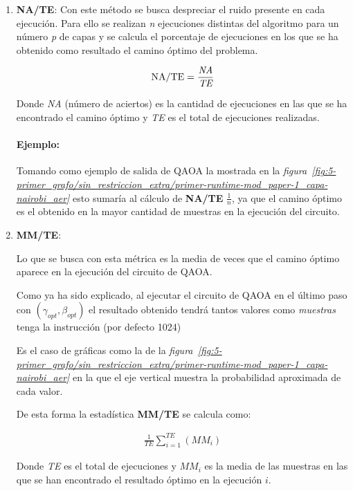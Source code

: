 \begin{enumerate}
\item\label{it:5-na} \textbf{NA/TE}:
  Con este método se busca despreciar el ruido presente en cada ejecución.
  Para ello se realizan \textit{n} ejecuciones distintas del algoritmo para un número \textit{p} de capas y se calcula el porcentaje de ejecuciones en los que se ha obtenido como resultado el camino óptimo del problema.

  \begin{align*}
    \textnormal{NA/TE} = \frac{\textit{NA}}{\textit{TE}}
  \end{align*}

  Donde \textit{NA} (número de aciertos) es la cantidad de ejecuciones en las que se ha encontrado el camino óptimo y \textit{TE} es el total de ejecuciones realizadas.

  \paragraph{Ejemplo:}
  Tomando como ejemplo de salida de QAOA la mostrada en la \textit{figura~\ref{fig:5-primer_grafo/sin_restriccion_extra/primer-runtime-mod_paper-1_capa-nairobi_aer}} esto sumaría al cálculo de \textbf{NA/TE} $\frac{1}{n}$, ya que el camino óptimo es el obtenido en la mayor cantidad de muestras en la ejecución del circuito.
  
\item\label{it:5-mm} \textbf{MM/TE}:

  Lo que se busca con esta métrica es la media de veces que el camino óptimo aparece en la ejecución del circuito de QAOA\@.

  Como ya ha sido explicado, al ejecutar el circuito de QAOA en el último paso con $(\gamma_{opt}, \beta_{opt})$ el resultado obtenido tendrá tantos valores como \textit{muestras} tenga la instrucción (por defecto 1024)

  Es el caso de gráficas como la de la \textit{figura~\ref{fig:5-primer_grafo/sin_restriccion_extra/primer-runtime-mod_paper-1_capa-nairobi_aer}}
  en la que el eje vertical muestra la probabilidad aproximada de cada valor.

  De esta forma la estadística \textbf{MM/TE} se calcula como:

  \begin{align*}
    \frac{1}{\textit{TE}} \sum_{i = 1}^\textit{TE} (\textit{MM}_i)
  \end{align*}

  Donde \textit{TE} es el total de ejecuciones y $\textit{MM}_i$ es la media de las muestras en las que se han encontrado el resultado óptimo en la ejecución $i$.


\end{enumerate}
